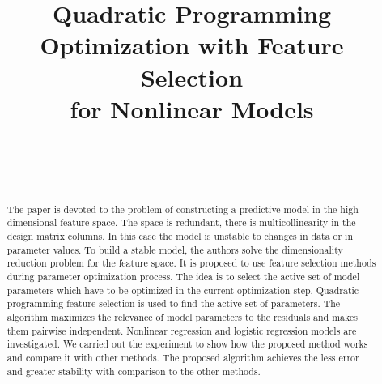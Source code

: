 \documentclass[
11pt,%
tightenlines,%
twoside,%
onecolumn,%
nofloats,%
nobibnotes,%
nofootinbib,%
superscriptaddress,%
noshowpacs,%
centertags]%
{revtex4}
\begin{document}

\title{Quadratic Programming Optimization with Feature Selection \\ for Nonlinear Models}

\author{~}

\author{~}




\begin{abstract} %
The paper is devoted to the problem of constructing a predictive model in the high-dimensional feature space.
The space is redundant, there is multicollinearity in the design matrix columns.
In this case the model is unstable to changes in data or in parameter values. 
To build a stable model, the authors solve the dimensionality reduction problem for the feature space.
It is proposed to use feature selection methods during parameter optimization process.
The idea is to select the active set of model parameters which have to be optimized in the current optimization step.
Quadratic programming feature selection is used to find the active set of parameters. 
The algorithm maximizes the relevance of model parameters to the residuals and makes them pairwise independent. 
Nonlinear regression and logistic regression models are investigated. 
We carried out the experiment to show how the proposed method works and compare it with other methods. 
The proposed algorithm achieves the less error and greater stability with comparison to the other methods.
\end{abstract}
\end{document}

